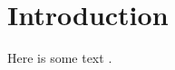 \documentclass[sigplan,review]{acmart}
\begin{document}
%


%
\maketitle

\section{Introduction}

Here is some text \cite{hypothesis}.




% 
\end{document}
